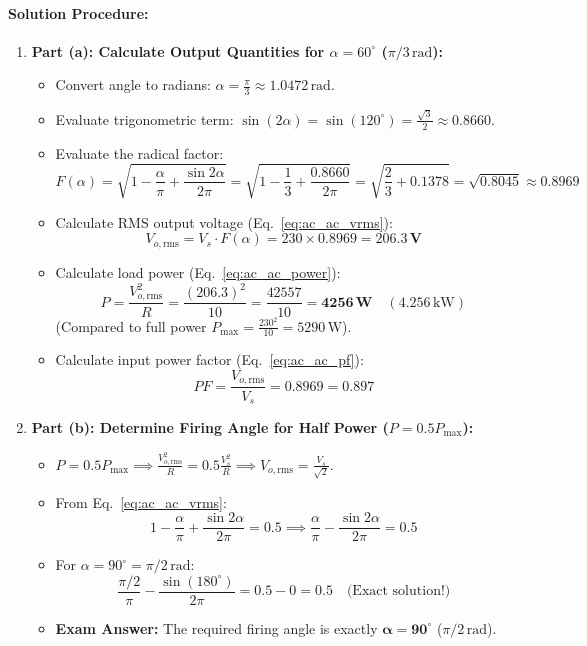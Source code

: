 \paragraph{Solution Procedure:}
\begin{enumerate}
  \item \textbf{Part (a): Calculate Output Quantities for $\alpha = 60^\circ$ ($\pi/3\,\si{\radian}$):}
  \begin{itemize}
    \item Convert angle to radians: $\alpha = \frac{\pi}{3} \approx 1.0472\,\si{\radian}$.
    \item Evaluate trigonometric term: $\sin(2\alpha) = \sin(120^\circ) = \frac{\sqrt{3}}{2} \approx 0.8660$.
    \item Evaluate the radical factor:
    \[
    F(\alpha) = \sqrt{1 - \frac{\alpha}{\pi} + \frac{\sin 2\alpha}{2\pi}} = \sqrt{1 - \frac{1}{3} + \frac{0.8660}{2\pi}} = \sqrt{\frac{2}{3} + 0.1378} = \sqrt{0.8045} \approx 0.8969
    \]
    \item Calculate RMS output voltage (Eq.~\ref{eq:ac_ac_vrms}):
    \[
    V_{o,\mathrm{rms}} = V_s \cdot F(\alpha) = 230 \times 0.8969 = \mathbf{206.3\,\si{\volt}}
    \]
    \item Calculate load power (Eq.~\ref{eq:ac_ac_power}):
    \[
    P = \frac{V_{o,\mathrm{rms}}^2}{R} = \frac{(206.3)^2}{10} = \frac{42557}{10} = \mathbf{4256\,\si{\watt}} \quad (4.256\,\si{\kilo\watt})
    \]
    (Compared to full power $P_{\max} = \frac{230^2}{10} = 5290\,\si{\watt}$).
    \item Calculate input power factor (Eq.~\ref{eq:ac_ac_pf}):
    \[
    PF = \frac{V_{o,\mathrm{rms}}}{V_s} = 0.8969 = \mathbf{0.897}
    \]
  \end{itemize}

  \item \textbf{Part (b): Determine Firing Angle for Half Power ($P = 0.5 P_{\max}$):}
  \begin{itemize}
    \item $P = 0.5 P_{\max} \implies \frac{V_{o,\mathrm{rms}}^2}{R} = 0.5 \frac{V_s^2}{R} \implies V_{o,\mathrm{rms}} = \frac{V_s}{\sqrt{2}}$.
    \item From Eq.~\ref{eq:ac_ac_vrms}:
    \[
    1 - \frac{\alpha}{\pi} + \frac{\sin 2\alpha}{2\pi} = 0.5 \implies \frac{\alpha}{\pi} - \frac{\sin 2\alpha}{2\pi} = 0.5
    \]
    \item For $\alpha = 90^\circ = \pi/2\,\si{\radian}$:
    \[
    \frac{\pi/2}{\pi} - \frac{\sin(180^\circ)}{2\pi} = 0.5 - 0 = 0.5 \quad \text{(Exact solution!)}
    \]
    \item \textbf{Exam Answer:} The required firing angle is exactly $\mathbf{\alpha = 90^\circ}$ ($\pi/2\,\si{\radian}$).
  \end{itemize}
\end{enumerate}

